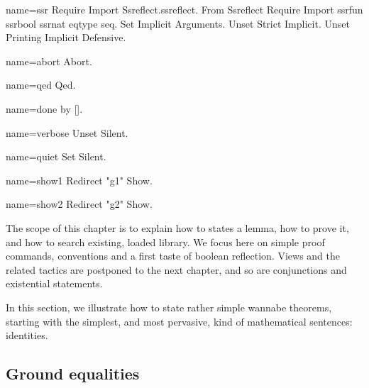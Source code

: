 \begin{coqdef}{name=ssr}
Require Import Ssreflect.ssreflect.
From Ssreflect Require Import ssrfun ssrbool ssrnat eqtype seq.
Set Implicit Arguments.
Unset Strict Implicit.
Unset Printing Implicit Defensive.
\end{coqdef}
\begin{coqdef}{name=abort}
Abort.
\end{coqdef}
\begin{coqdef}{name=qed}
Qed.
\end{coqdef}
\begin{coqdef}{name=done}
by [].
\end{coqdef}
\begin{coqdef}{name=verbose}
Unset Silent.
\end{coqdef}
\begin{coqdef}{name=quiet}
Set Silent.
\end{coqdef}
\begin{coqdef}{name=show1}
Redirect "g1" Show.
\end{coqdef}
\begin{coqdef}{name=show2}
Redirect "g2" Show.
\end{coqdef}


The scope of this chapter is to explain how to states a lemma,
how to prove it, and how to search existing, loaded library.
We focus here on simple proof commands, conventions and a first taste
of boolean reflection. Views and the related tactics are postponed to the
next chapter, and so are conjunctions and existential statements.





In this section, we illustrate how to state rather simple wannabe
theorems, starting with the simplest, and most pervasive, kind of
mathematical sentences: identities.

\subsection{Ground equalities}\label{ssec:groundeq}

